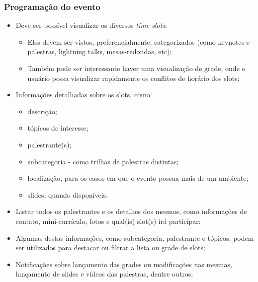 \documentclass[a4paper]{abntex2}
\begin{document}
\subsubsection*{Programação do evento}
\begin{itemize}
	\item Deve ser possível visualizar os diversos \emph{time slots}:
		\begin{itemize}
			\item Eles devem ser vistos, preferencialmente, categorizados (como keynotes e palestras, lightning talks, mesas-redondas, etc);
			\item Também pode ser interessante haver uma visualização de grade, onde o usuário possa visualizar rapidamente os conflitos de horário dos slots;
		\end{itemize}
	\item Informações detalhadas sobre os slots, como:
		\begin{itemize}
			\item descrição;
			\item tópicos de interesse;
			\item palestrante(s);
			\item subcategoria - como trilhas de palestras distintas;
			\item localização, para os casos em que o evento possua mais de um ambiente;
			\item slides, quando disponíveis.
		\end{itemize}
	\item Listar todos os palestrantes e os detalhes dos mesmos, como informações de contato, mini-currículo, fotos e qual(is) slot(s) irá participar;
	\item Algumas destas informações, como subcategoria, palestrante e tópicos, podem ser utilizados para destacar ou filtrar a lista ou grade de slots;
	\item Notificações sobre lançamento das grades ou modificações nas mesmas, lançamento de slides e vídeos das palestras, dentre outros;
\end{itemize}
\end{document}

